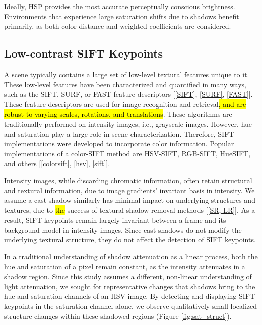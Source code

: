 Ideally, HSP provides the most accurate perceptually conscious brightness. Environments that experience large saturation shifts due to shadows benefit primarily, as both color distance and weighted coefficients are considered.

\subsection{Low-contrast SIFT Keypoints} \label{section:lowcSIFT}

A scene typically contains a large set of low-level textural features unique to it. These low-level features have been characterized and quantified in many ways, such as the SIFT, SURF, or FAST feature descriptors [\ref{SIFT}, \ref{SURF}, \ref{FAST}]. These feature descriptors are used for image recognition and retrieval\hl{, and are robust to varying scales, rotations, and translations}. These algorithms are traditionally performed on intensity images, i.e., grayscale images. However, hue and saturation play a large role in scene characterization. Therefore, SIFT implementations were developed to incorporate color information. Popular implementations of a color-SIFT method are HSV-SIFT, RGB-SIFT, HueSIFT, and others [\ref{colorsift}, \ref{hsv}, \ref{sift}].

Intensity images, while discarding chromatic information, often retain structural and textural information, due to image gradients' invariant basis in intensity. We assume a cast shadow similarly has minimal impact on underlying structures and textures, due to \hl{the} success of textural shadow removal methods [\ref{SR, LR}]. As a result, SIFT keypoints remain largely invariant between a frame and its background model in intensity images. Since cast shadows do not modify the underlying textural structure, they do not affect the detection of SIFT keypoints.

In a traditional understanding of shadow attenuation as a linear process, both the hue and saturation of a pixel remain constant, as the intensity attenuates in a shadow region. Since this study assumes a different, non-linear understanding of light attenuation, we sought for representative changes that shadows bring to the hue and saturation channels of an HSV image. By detecting and displaying SIFT keypoints in the saturation channel alone, we observe qualitatively small localized structure changes within these shadowed regions (Figure \ref{fig:sat_struct}).

